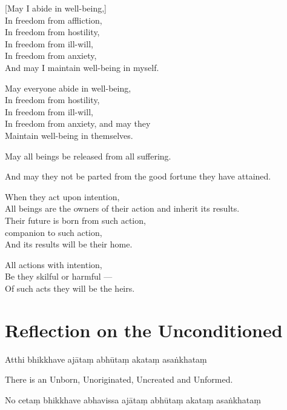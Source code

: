 [May I abide in well-being,]\\
In freedom from affliction,\\
In freedom from hostility,\\
In freedom from ill-will,\\
In freedom from anxiety,\\
And may I maintain well-being in myself.

May everyone abide in well-being,\\
In freedom from hostility,\\
In freedom from ill-will,\\
In freedom from anxiety, and may they\\
Maintain well-being in themselves.

May all beings be released from all suffering.

And may they not be parted from the good fortune they have attained.

When they act upon intention,\\
All beings are the owners of their action and inherit its results.\\
Their future is born from such action,\\
companion to such action,\\
And its results will be their home.

All actions with intention,\\
Be they skilful or harmful ---\\
Of such acts they will be the heirs.


\section[The Unconditioned]{Reflection on the Unconditioned}

\begin{leader}
\end{leader}


Atthi bhikkhave ajātaṃ abhūtaṃ akataṃ asaṅkhataṃ

\begin{english}
  There is an Unborn, Unoriginated, Uncreated and Unformed.
\end{english}

No cetaṃ bhikkhave abhavissa ajātaṃ abhūtaṃ akataṃ asaṅkhataṃ

